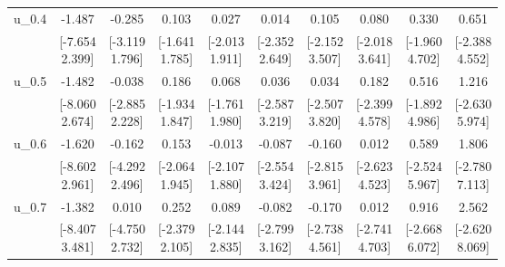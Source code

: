 {\begin{tabular}{lccccccccc}
u\_0.4 & -1.487 & -0.285 & 0.103 & 0.027 & 0.014 & 0.105 & 0.080 & 0.330 & 0.651 \\
 & \shortstack{[-7.654\\2.399]} & \shortstack{[-3.119\\1.796]} & \shortstack{[-1.641\\1.785]} & \shortstack{[-2.013\\1.911]} & \shortstack{[-2.352\\2.649]} & \shortstack{[-2.152\\3.507]} & \shortstack{[-2.018\\3.641]} & \shortstack{[-1.960\\4.702]} & \shortstack{[-2.388\\4.552]} \\[0.25em]
u\_0.5 & -1.482 & -0.038 & 0.186 & 0.068 & 0.036 & 0.034 & 0.182 & 0.516 & 1.216 \\
 & \shortstack{[-8.060\\2.674]} & \shortstack{[-2.885\\2.228]} & \shortstack{[-1.934\\1.847]} & \shortstack{[-1.761\\1.980]} & \shortstack{[-2.587\\3.219]} & \shortstack{[-2.507\\3.820]} & \shortstack{[-2.399\\4.578]} & \shortstack{[-1.892\\4.986]} & \shortstack{[-2.630\\5.974]} \\[0.25em]
u\_0.6 & -1.620 & -0.162 & 0.153 & -0.013 & -0.087 & -0.160 & 0.012 & 0.589 & 1.806 \\
 & \shortstack{[-8.602\\2.961]} & \shortstack{[-4.292\\2.496]} & \shortstack{[-2.064\\1.945]} & \shortstack{[-2.107\\1.880]} & \shortstack{[-2.554\\3.424]} & \shortstack{[-2.815\\3.961]} & \shortstack{[-2.623\\4.523]} & \shortstack{[-2.524\\5.967]} & \shortstack{[-2.780\\7.113]} \\[0.25em]
u\_0.7 & -1.382 & 0.010 & 0.252 & 0.089 & -0.082 & -0.170 & 0.012 & 0.916 & 2.562 \\
 & \shortstack{[-8.407\\3.481]} & \shortstack{[-4.750\\2.732]} & \shortstack{[-2.379\\2.105]} & \shortstack{[-2.144\\2.835]} & \shortstack{[-2.799\\3.162]} & \shortstack{[-2.738\\4.561]} & \shortstack{[-2.741\\4.703]} & \shortstack{[-2.668\\6.072]} & \shortstack{[-2.620\\8.069]} \\[0.25em]

\end{tabular}}
